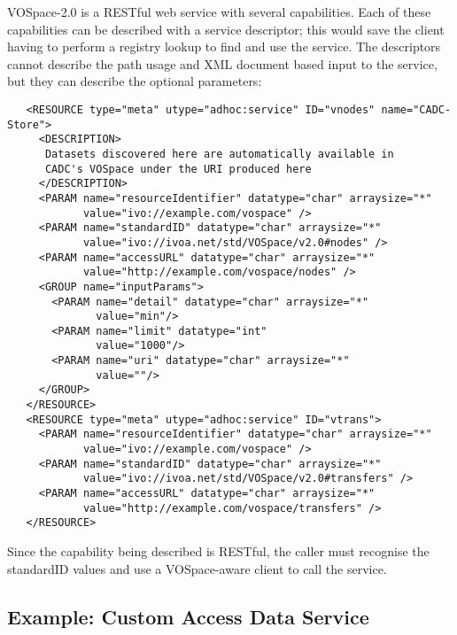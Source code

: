 \documentclass[11pt,a4paper]{ivoa}
\begin{document}
VOSpace-2.0 is a RESTful web service with several capabilities. Each of
these capabilities can be described with a service descriptor; this would
save the client having to perform a registry lookup to find and use the
service. The descriptors cannot describe the path usage and XML document
based input to the service, but they can describe the optional parameters:
\begin{verbatim}
   <RESOURCE type="meta" utype="adhoc:service" ID="vnodes" name="CADC-Store">
     <DESCRIPTION>
      Datasets discovered here are automatically available in 
      CADC's VOSpace under the URI produced here
     </DESCRIPTION>
     <PARAM name="resourceIdentifier" datatype="char" arraysize="*"
            value="ivo://example.com/vospace" />
     <PARAM name="standardID" datatype="char" arraysize="*"
            value="ivo://ivoa.net/std/VOSpace/v2.0#nodes" />
     <PARAM name="accessURL" datatype="char" arraysize="*"
            value="http://example.com/vospace/nodes" />
     <GROUP name="inputParams">
       <PARAM name="detail" datatype="char" arraysize="*"
              value="min"/>
       <PARAM name="limit" datatype="int"
              value="1000"/>
       <PARAM name="uri" datatype="char" arraysize="*"
              value=""/>
     </GROUP>
   </RESOURCE>
   <RESOURCE type="meta" utype="adhoc:service" ID="vtrans">
     <PARAM name="resourceIdentifier" datatype="char" arraysize="*"
            value="ivo://example.com/vospace" />
     <PARAM name="standardID" datatype="char" arraysize="*"
            value="ivo://ivoa.net/std/VOSpace/v2.0#transfers" />
     <PARAM name="accessURL" datatype="char" arraysize="*"
            value="http://example.com/vospace/transfers" />
   </RESOURCE>
\end{verbatim}
Since the capability being described is RESTful, the
caller must recognise the standardID values and use a VOSpace-aware
client to call the service.


\subsection{Example: Custom Access Data Service}
\end{document}
